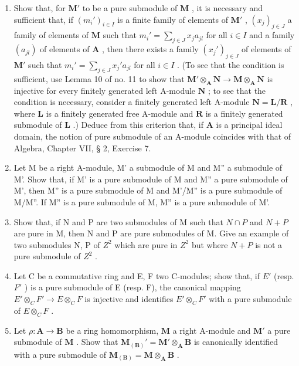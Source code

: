 \begin{enumerate}
\def\labelenumi{(\alph{enumi})}
\item
  Show that, for \(\mathbf{M}'\) to be a pure submodule of \(\mathbf{M}\) , it is necessary and sufficient that, if \((m_i')_{i\in I}\) is a finite family of elements of \(\mathbf{M}'\) , \((x_j)_{j\in J}\) a family of elements of \(\mathbf{M}\) such that \(m_i' = \sum_{j\in J} x_j a_{jl}\) for all \(i\in I\) and a family \((a_{jl})\) of elements of \(\mathbf{A}\) , then there exists a family \((x_j')_{j\in J}\) of elements of \(\mathbf{M}'\) such that \(m_i' = \sum_{j\in J} x_j' a_{jl}\) for all \(i\in I\) . (To see that the condition is sufficient, use Lemma 10 of no. 11 to show that \(\mathbf{M}' \otimes_{\mathbf{A}} \mathbf{N} \to \mathbf{M} \otimes_{\mathbf{A}} \mathbf{N}\) is injective for every finitely generated left A-module \(\mathbf{N}\) ; to see that the condition is necessary, consider a finitely generated left A-module \(\mathbf{N} = \mathbf{L}/\mathbf{R}\) , where \(\mathbf{L}\) is a finitely generated free A-module and \(\mathbf{R}\) is a finitely generated submodule of \(\mathbf{L}\) .) Deduce from this criterion that, if \(\mathbf{A}\) is a principal ideal domain, the notion of pure submodule of an A-module coincides with that of Algebra, Chapter VII, § 2, Exercise 7.
\item
  Let M be a right A-module, M' a submodule of M and M'' a submodule of M'. Show that, if M' is a pure submodule of M and M'' a pure submodule of M', then M'' is a pure submodule of M and M'/M'' is a pure submodule of M/M''. If M'' is a pure submodule of M, M'' is a pure submodule of M'.
\item
  Show that, if N and P are two submodules of M such that \(N \cap P\) and \(N + P\) are pure in M, then N and P are pure submodules of M. Give an example of two submodules N, P of \(Z^{2}\) which are pure in \(Z^{2}\) but where \(N + P\) is not a pure submodule of \(Z^{2}\) .
\item
  Let C be a commutative ring and E, F two C-modules; show that, if \(E'\) (resp. \(F'\) ) is a pure submodule of E (resp. F), the canonical mapping \(E' \otimes_{C} F' \to E \otimes_{C} F\) is injective and identifies \(E' \otimes_{C} F'\) with a pure submodule of \(E \otimes_{C} F\) .
\item
  Let \(\rho: \mathbf{A} \to \mathbf{B}\) be a ring homomorphism, \(\mathbf{M}\) a right A-module and \(\mathbf{M}'\) a pure submodule of \(\mathbf{M}\) . Show that \(\mathbf{M}_{(\mathbf{B})}' = \mathbf{M}' \otimes_{\mathbf{A}} \mathbf{B}\) is canonically identified with a pure submodule of \(\mathbf{M}_{(\mathbf{B})} = \mathbf{M} \otimes_{\mathbf{A}} \mathbf{B}\) .
\end{enumerate}

